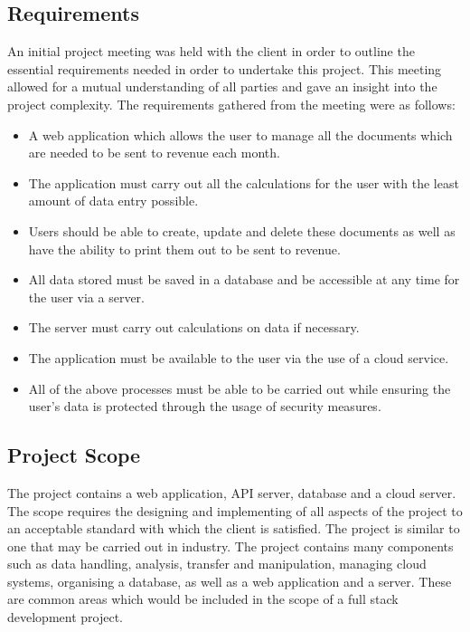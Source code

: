 \subsection{Requirements}
An initial project meeting was held with the client in order to outline the essential requirements needed in order to undertake this project. This meeting allowed for a mutual understanding of all parties and gave an insight into the project complexity. The requirements gathered from the meeting were as follows:
\begin{itemize}
    \item A web application which allows the user to manage all the documents which are needed to be sent to revenue each month.
    \item The application must carry out all the calculations for the user with the least amount of data entry possible.
    \item Users should be able to create, update and delete these documents as well as have the ability to print them out to be sent to revenue. 
    \item All data stored must be saved in a database and be accessible at any time for the user via a server.
    \item The server must carry out calculations on data if necessary.
    \item The application must be available to the user via the use of a cloud service.
    \item All of the above processes must be able to be carried out while ensuring the user's data is protected through the usage of security measures.
\end{itemize}


\subsection{Project Scope}
The project contains a web application, API server, database and a cloud server. The scope requires the designing and implementing of all aspects of the project to an acceptable standard with which the client is satisfied. The project is similar to one that may be carried out in industry. The project contains many components such as data handling, analysis, transfer and manipulation, managing cloud systems, organising a database, as well as a web application and a server. These are common areas which would be included in the scope of a full stack development project.
\newpage

